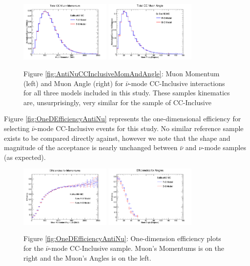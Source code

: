 \documentclass[11pt]{article}
\begin{document}
\begin{figure}[H]
\centering
\includegraphics[width=0.4\textwidth]{CCInclusivePlots/ANMCCInclusiveTotalMomentum.png}
\includegraphics[width=0.4\textwidth]{CCInclusivePlots/ANMCCInclusiveTotalAngle.png}
\caption*{Figure \ref*{fig:AntiNuCCInclusiveMomAndAngle}: Muon Momentum (left) and Muon Angle (right) for $\bar{\nu}$-mode CC-Inclusive interactions for all three models included in this study. These samples kinematics are, unsurprisingly, very similar for the sample of CC-Inclusive}
\end{figure}\label{fig:AntiNuCCInclusiveMomAndAngle}

Figure \ref*{fig:OneDEfficiencyAntiNu} represents the one-dimensional efficiency for selecting $\bar{\nu}$-mode CC-Inclusive events for this study. No similar reference sample exists to be compared directly against, however we note that the shape and magnitude of the acceptance is nearly unchanged between $\bar{\nu}$ and $\nu$-mode samples (as expected).

\begin{figure}[H]
\centering
\includegraphics[width=0.4\textwidth]{CCInclusivePlots/OneDAntiNuEffMomentum.png}
\includegraphics[width=0.4\textwidth]{CCInclusivePlots/OneDAntiNuEffAngle.png}
\caption*{Figure \ref*{fig:OneDEfficiencyAntiNu}: One-dimension efficiency plots for the $\bar{\nu}$-mode CC-Inclusive sample. Muon's Momentums is on the right and the Muon's Angles is on the left.}
\end{figure}\label{fig:OneDEfficiencyAntiNu}
\end{document}
